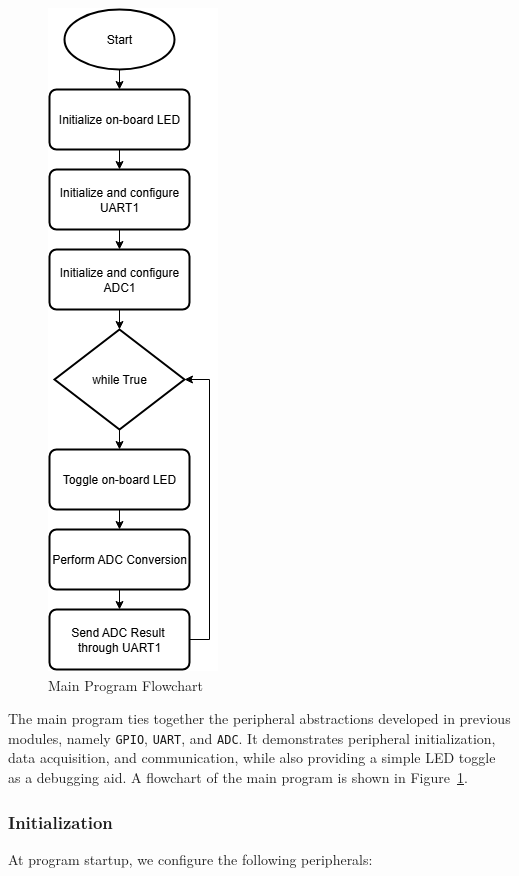 \documentclass[12pt,a4paper]{article}
\begin{document}
\begin{figure}[htbp]
    \centering
    \includegraphics{images/sara-flow.png}
    \caption{Main Program Flowchart}
    \label{fig: flowchart}
\end{figure}

The main program ties together the peripheral abstractions developed in previous modules, namely \texttt{GPIO}, \texttt{UART}, and \texttt{ADC}. It demonstrates peripheral initialization, data acquisition, and communication, while also providing a simple LED toggle as a debugging aid. A flowchart of the main program is shown in Figure~\ref{fig: flowchart}.

\subsubsection{Initialization}

At program startup, we configure the following peripherals:
\end{document}
